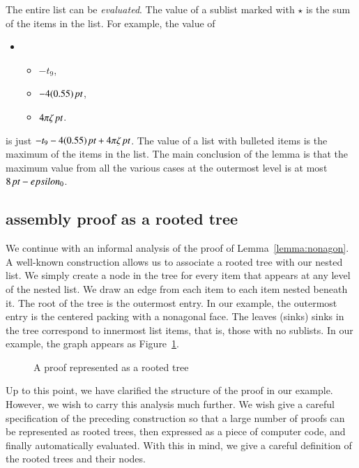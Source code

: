 The entire list can be {\it evaluated}.  The value of
a sublist marked with $\star$ is the sum of the items in the list.
For example, the value of 
\begin{itemize}\item[]
\begin{itemize}
\item $-t_9$,
\item $-4(0.55)\,\hbox{\it pt}$,
\item $4\pi\zeta\,\hbox{\it pt}$.
\end{itemize}
\end{itemize}
is just $-t_9 - 4(0.55)\,\hbox{\it pt} + 4\pi\zeta\,\hbox{\it pt}$.
The value of a list with bulleted items
is the maximum of the items in the list.
The main conclusion of the lemma is that the maximum value from all
the various cases at the outermost level is at most $8\,\hbox{\it pt} -epsilon_0$.


\subsection{assembly proof as a rooted tree}

We continue with an informal analysis of the proof of Lemma~\ref{lemma:nonagon}.
A well-known construction allows us to associate a rooted
tree with our nested list.  We simply create a node in the tree
for every item that appears at any level of the nested list.  We
draw an edge from each item to each item nested beneath it.
The root of the tree is the outermost entry.  In our example, the
outermost entry is the centered packing with a nonagonal face.
The leaves (sinks) sinks in the tree correspond to innermost list
items, that is, those with no sublists.  In our example, the graph
appears as Figure~\ref{fig:rooted-tree}. 

\begin{figure}[htb]
  \centering
  \caption{A proof represented as a rooted tree}
  \label{fig:rooted-tree}
\end{figure}

Up to this point, we have clarified the structure of the proof in
our example.  However, we wish to carry this analysis much further.
We wish give a careful specification of the preceding construction
so that a large number of proofs 
can be represented as rooted trees, then
expressed as a piece of computer code, and finally automatically evaluated.
With this in mind, we give a careful definition of the rooted
trees and their nodes.

